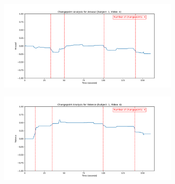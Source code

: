 \documentclass[11pt, letterpaper]{article}
\begin{document}
\begin{figure}
        \centering
    \begin{subfigure}[t]{0.49\textwidth}
        \centering
        \includegraphics[width=\linewidth]{sub_1_changepoints_V4_arousal} 
        \caption{} \label{fig:sub_1_changepoints_V4_arousal}
    \end{subfigure}
    \hfill
    \begin{subfigure}[t]{0.49\textwidth}
        \centering
        \includegraphics[width=\linewidth]{sub_1_changepoints_V4_valence} 
        \caption{} \label{fig:sub_1_changepoints_V4_valence}
    \end{subfigure}
\end{figure}
\end{document}
